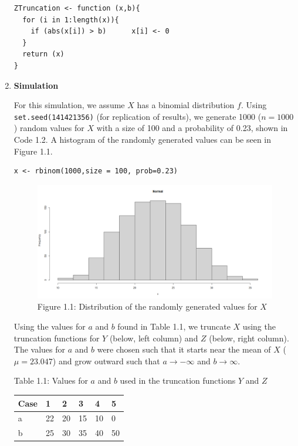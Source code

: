 \documentclass[12pt,letterpaper]{article}
\newcommand{\code}[1]{\colorbox{light-gray}{\texttt{#1}}}
\begin{document}
\begin{enumerate}[label=\Alph*]
\begin{lstlisting}[title=\footnotesize Code 1.1: Function for the truncation of $Y$ and $Z$]
ZTruncation <- function (x,b){
  for (i in 1:length(x)){
    if (abs(x[i]) > b)      x[i] <- 0
  }
  return (x)
}
        \end{lstlisting}
        \vspace*{0.5cm}
       \item \textbf{Simulation} 
       
       For this simulation, we assume $X$ has a binomial distribution $f$. Using \code{set.seed(141421356)} (for replication of results), we generate 1000 ($n=1000$) random values for $X$ with a size of 100 and a probability of 0.23, shown in Code 1.2. A histogram of the randomly generated values can be seen in Figure 1.1.
       \begin{lstlisting}[title=\footnotesize Code 1.2: Initialization of $X$]
x <- rbinom(1000,size = 100, prob=0.23)  
       \end{lstlisting}

       \begin{figure}[h]
          \centering 
          \includegraphics[scale=0.4]{normal.png}
          \caption*{\footnotesize Figure 1.1: Distribution of the randomly generated values for $X$}
       \end{figure}
       
       \newpage
       Using the values for $a$ and $b$ found in Table 1.1, we truncate $X$ using the truncation functions for $Y$ (below, left column) and $Z$ (below, right column). The values for $a$ and $b$ were chosen such that it starts near the mean of $X$ ($\mu = 23.047$) and grow outward such that $a\rightarrow -\infty$ and $b \rightarrow \infty$.

       \begin{table}[H]\centering
          \footnotesize Table 1.1: Values for $a$ and $b$ used in the truncation functions $Y$ and $Z$

       \vspace*{0.3cm}
          \begin{tabular}{l|lllll} \toprule
            Case  & 1   &  2  &  3  &  4   &  5\\ \midrule
            a     & 22  &  20 &  15 &  10  &  0\\
            b     & 25  &  30 &  35 &  40  &  50\\ \bottomrule
          \end{tabular}
       \end{table}


\end{enumerate}
\end{document}
